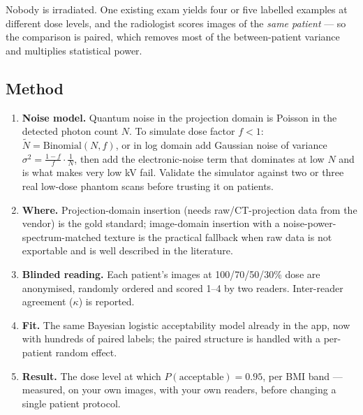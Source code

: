 \documentclass[10pt,a4paper]{article}
\begin{document}
\begin{callout}
Nobody is irradiated. One existing exam yields four or five labelled examples at different dose levels, and the
radiologist scores images of the \textit{same patient} --- so the comparison is paired, which removes most of the
between-patient variance and multiplies statistical power.
\end{callout}

\subsection{Method}
\begin{enumerate}
\item \textbf{Noise model.} Quantum noise in the projection domain is Poisson in the detected photon count $N$.
To simulate dose factor $f<1$: $\tilde N = \mathrm{Binomial}(N, f)$, or in log domain add Gaussian noise of variance
$\sigma^2 = \frac{1-f}{f}\cdot\frac{1}{N}$, then add the electronic-noise term that dominates at low $N$ and is
what makes very low kV fail. Validate the simulator against two or three real low-dose phantom scans before
trusting it on patients.
\item \textbf{Where.} Projection-domain insertion (needs raw/CT-projection data from the vendor) is the gold
standard; image-domain insertion with a noise-power-spectrum-matched texture is the practical fallback when raw
data is not exportable and is well described in the literature.
\item \textbf{Blinded reading.} Each patient's images at 100/70/50/30\% dose are anonymised, randomly ordered and
scored 1--4 by two readers. Inter-reader agreement ($\kappa$) is reported.
\item \textbf{Fit.} The same Bayesian logistic acceptability model already in the app, now with hundreds of paired
labels; the paired structure is handled with a per-patient random effect.
\item \textbf{Result.} The dose level at which $P(\text{acceptable}) = 0.95$, per BMI band --- measured, on your
own images, with your own readers, before changing a single patient protocol.
\end{enumerate}
\end{document}
